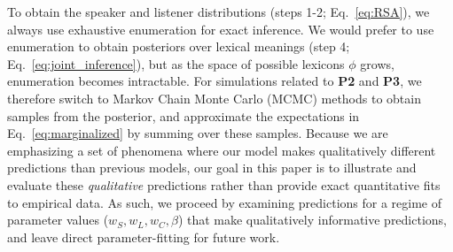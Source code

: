 To obtain the speaker and listener distributions (steps 1-2; Eq.~\ref{eq:RSA}), we always use exhaustive enumeration for exact inference.
We would prefer to use enumeration to obtain posteriors over lexical meanings (step 4; Eq.~\ref{eq:joint_inference}), but as the space of possible lexicons $\phi$ grows, enumeration becomes intractable.
For simulations related to \textbf{P2} and \textbf{P3}, we therefore switch to Markov Chain Monte Carlo (MCMC) methods to obtain samples from the posterior, and approximate the expectations in Eq.~\ref{eq:marginalized} by summing over these samples. 
Because we are emphasizing a set of phenomena where our model makes qualitatively different predictions than previous models, our goal in this paper is to illustrate and evaluate these \emph{qualitative} predictions rather than provide exact quantitative fits to empirical data.
As such, we proceed by examining predictions for a regime of parameter values ($w_S, w_L, w_C,\beta$) that make qualitatively informative predictions, and leave direct parameter-fitting for future work. 
